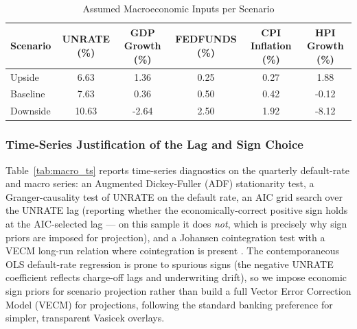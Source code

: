 \documentclass[11pt,a4paper]{article}
\begin{document}
\begin{table}[H]
\centering
\caption{Assumed Macroeconomic Inputs per Scenario}
\label{tab:scenario_inputs}
\vspace{0.5em}
\begin{tabular}{lccccc}
\toprule
\textbf{Scenario} & \textbf{UNRATE (\%)} & \textbf{GDP Growth (\%)} & \textbf{FEDFUNDS (\%)} & \textbf{CPI Inflation (\%)} & \textbf{HPI Growth (\%)} \\
\midrule
Upside & 6.63 & 1.36 & 0.25 & 0.27 & 1.88 \\
Baseline & 7.63 & 0.36 & 0.50 & 0.42 & -0.12 \\
Downside & 10.63 & -2.64 & 2.50 & 1.92 & -8.12 \\
\bottomrule
\end{tabular}
\end{table}

\subsubsection*{Time-Series Justification of the Lag and Sign Choice}
Table~\ref{tab:macro_ts} reports time-series diagnostics on the quarterly default-rate and macro series: an Augmented Dickey-Fuller (ADF) stationarity test, a Granger-causality test of UNRATE on the default rate, an AIC grid search over the UNRATE lag (reporting whether the economically-correct positive sign holds at the AIC-selected lag --- on this sample it does \emph{not}, which is precisely why sign priors are imposed for projection), and a Johansen cointegration test with a VECM long-run relation where cointegration is present \parencite{engelmann2011}. The contemporaneous OLS default-rate regression is prone to spurious signs (the negative UNRATE coefficient reflects charge-off lags and underwriting drift), so we impose economic sign priors for scenario projection rather than build a full Vector Error Correction Model (VECM) for projections, following the standard banking preference for simpler, transparent Vasicek overlays.
\end{document}
